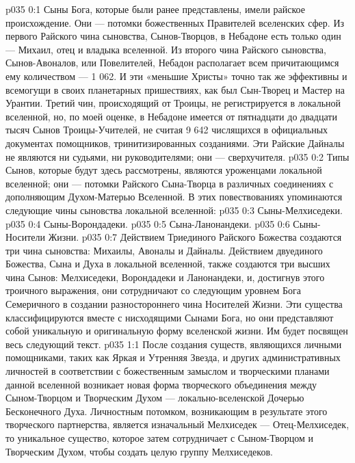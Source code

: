 \author{Глава Архангелов}
\vs p035 0:1 Сыны Бога, которые были ранее представлены, имели райское происхождение. Они --- потомки божественных Правителей вселенских сфер. Из первого Райского чина сыновства, Сынов\hyp{}Творцов, в Небадоне есть только один --- Михаил, отец и владыка вселенной. Из второго чина Райского сыновства, Сынов\hyp{}Авоналов, или Повелителей, Небадон располагает всем причитающимся ему количеством --- 1 062. И эти «меньшие Христы» точно так же эффективны и всемогущи в своих планетарных пришествиях, как был Сын\hyp{}Творец и Мастер на Урантии. Третий чин, происходящий от Троицы, не регистрируется в локальной вселенной, но, по моей оценке, в Небадоне имеется от пятнадцати до двадцати тысяч Сынов Троицы\hyp{}Учителей, не считая 9 642 числящихся в официальных документах помощников, тринитизированных созданиями. Эти Райские Дайналы не являются ни судьями, ни руководителями; они --- сверхучителя.
\vs p035 0:2 Типы Сынов, которые будут здесь рассмотрены, являются уроженцами локальной вселенной; они --- потомки Райского Сына\hyp{}Творца в различных соединениях с дополняющим Духом\hyp{}Матерью Вселенной. В этих повествованиях упоминаются следующие чины сыновства локальной вселенной:
\vs p035 0:3 \bibnobreakspace Сыны\hyp{}Мелхиседеки.
\vs p035 0:4 \bibnobreakspace Сыны\hyp{}Ворондадеки.
\vs p035 0:5 \bibnobreakspace Сына\hyp{}Ланонандеки.
\vs p035 0:6 \bibnobreakspace Сыны\hyp{}Носители Жизни.
\vs p035 0:7 \pc Действием Триединого Райского Божества создаются три чина сыновства: Михаилы, Авоналы и Дайналы. Действием двуединого Божества, Сына и Духа в локальной вселенной, также создаются три высших чина Сынов: Мелхиседеки, Ворондадеки и Ланонандеки, и, достигнув этого троичного выражения, они сотрудничают со следующим уровнем Бога Семеричного в создании разностороннего чина Носителей Жизни. Эти существа классифицируются вместе с нисходящими Сынами Бога, но они представляют собой уникальную и оригинальную форму вселенской жизни. Им будет посвящен весь следующий текст.
\vs p035 1:1 После создания существ, являющихся личными помощниками, таких как Яркая и Утренняя Звезда, и других административных личностей в соответствии с божественным замыслом и творческими планами данной вселенной возникает новая форма творческого объединения между Сыном\hyp{}Творцом и Творческим Духом --- локально\hyp{}вселенской Дочерью Бесконечного Духа. Личностным потомком, возникающим в результате этого творческого партнерства, является изначальный Мелхиседек --- Отец\hyp{}Мелхиседек, то уникальное существо, которое затем сотрудничает с Сыном\hyp{}Творцом и Творческим Духом, чтобы создать целую группу Мелхиседеков.
